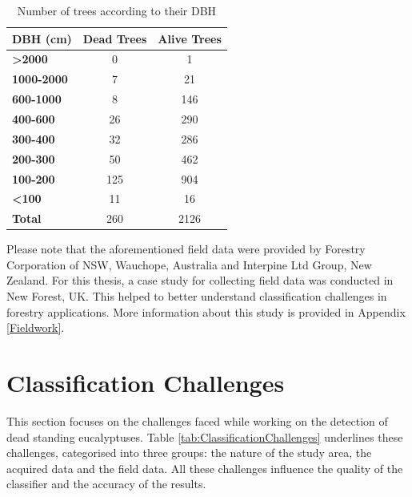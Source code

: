 \documentclass{subfiles}
\begin{document}
\begin{table}[!h]
	\centering
	\label{tab:DBH}
	\begin{tabular}{| l || c | c | }
		\hline		
		\textbf{DBH (cm)} &\textbf{Dead Trees} & \textbf{Alive Trees }\\	
		\hline			
		\hline			
		\textbf{>2000} & 0 & 1\\
		\hline			
		\textbf{1000-2000} & 7 & 21\\
		\hline			
		\textbf{600-1000} & 8 & 146\\
		\hline			
		\textbf{400-600} & 26 & 290\\
		\hline			
		\textbf{300-400} & 32 & 286\\
		\hline			
		\textbf{200-300} & 50 & 462\\
		\hline			
		\textbf{100-200} &125 & 904\\
		\hline			
		\textbf{<100} & 11 & 16\\
		\hline			
		\textbf{Total} & 260 & 2126 \\
		\hline  
	\end{tabular}
	\caption{Number of trees according to their DBH}
\end{table}

\par Please note that the aforementioned field data were provided by Forestry Corporation of NSW, Wauchope, Australia and Interpine Ltd Group, New Zealand. For this thesis, a case study for collecting field data was conducted in New Forest, UK. This helped to better understand classification challenges in forestry applications. More information about this study is provided in Appendix \ref{Fieldwork}.



\section{Classification Challenges}\label{sec:ClassficationChallenges}
\par This section focuses on the challenges faced while working on the detection of dead standing eucalyptuses. Table \ref{tab:ClassificationChallenges} underlines these challenges, categorised into three groups: the nature of the study area, the acquired data and the field data. All these challenges influence the quality of the classifier and the accuracy of the results. 
\end{document}
